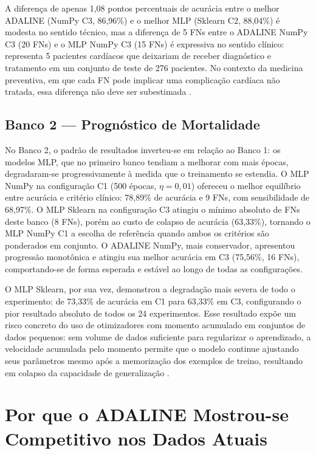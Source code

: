 A diferença de apenas 1,08 pontos percentuais de acurácia entre o melhor ADALINE (NumPy C3, 86,96\%) e o melhor MLP (Sklearn C2, 88,04\%) é modesta no sentido técnico, mas a diferença de 5 FNs entre o ADALINE NumPy C3 (20 FNs) e o MLP NumPy C3 (15 FNs) é expressiva no sentido clínico: representa 5 pacientes cardíacos que deixariam de receber diagnóstico e tratamento em um conjunto de teste de 276 pacientes. No contexto da medicina preventiva, em que cada FN pode implicar uma complicação cardíaca não tratada, essa diferença não deve ser subestimada \cite{porto2019}.

\subsection{Banco 2 --- Prognóstico de Mortalidade}

No Banco 2, o padrão de resultados inverteu-se em relação ao Banco 1: os modelos MLP, que no primeiro banco tendiam a melhorar com mais épocas, degradaram-se progressivamente à medida que o treinamento se estendia. O MLP NumPy na configuração C1 (500 épocas, $\eta = 0{,}01$) ofereceu o melhor equilíbrio entre acurácia e critério clínico: 78,89\% de acurácia e 9 FNs, com sensibilidade de 68,97\%. O MLP Sklearn na configuração C3 atingiu o mínimo absoluto de FNs deste banco (8 FNs), porém ao custo de colapso de acurácia (63,33\%), tornando o MLP NumPy C1 a escolha de referência quando ambos os critérios são ponderados em conjunto. O ADALINE NumPy, mais conservador, apresentou progressão monotônica e atingiu sua melhor acurácia em C3 (75,56\%, 16 FNs), comportando-se de forma esperada e estável ao longo de todas as configurações.

O MLP Sklearn, por sua vez, demonstrou a degradação mais severa de todo o experimento: de 73,33\% de acurácia em C1 para 63,33\% em C3, configurando o pior resultado absoluto de todos os 24 experimentos. Esse resultado expõe um risco concreto do uso de otimizadores com momento acumulado em conjuntos de dados pequenos: sem volume de dados suficiente para regularizar o aprendizado, a velocidade acumulada pelo momento permite que o modelo continue ajustando seus parâmetros mesmo após a memorização dos exemplos de treino, resultando em colapso da capacidade de generalização \cite{silva2016}.

\section{Por que o ADALINE Mostrou-se Competitivo nos Dados Atuais}

